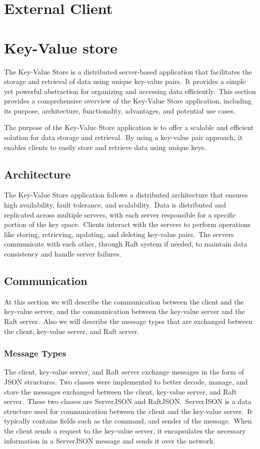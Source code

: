 \documentclass{article}
\begin{document}
\section{External Client}


\section{Key-Value store}
The Key-Value Store is a distributed server-based application that facilitates the storage
and retrieval of data using unique key-value pairs.\ It provides a simple yet powerful
abstraction for organizing and accessing data efficiently.\ This section provides a comprehensive
overview of the Key-Value Store application, including its purpose, architecture, functionality,
advantages, and potential use cases.

The purpose of the Key-Value Store application is to offer a scalable and efficient solution
for data storage and retrieval.\ By using a key-value pair approach, it enables clients to
easily store and retrieve data using unique keys.


\subsection{Architecture}
The Key-Value Store application follows a distributed architecture that ensures high availability,
fault tolerance, and scalability.\ Data is distributed and replicated across multiple servers,
with each server responsible for a specific portion of the key space.\ Clients interact with the
servers to perform operations like storing, retrieving, updating, and deleting key-value
pairs.\ The servers communicate with each other, through Raft system if needed, to maintain
data consistency and handle server failures.

\subsection{Communication}
At this section we will describe the communication between the client and the key-value server,
and the communication between the key-value server and the Raft server.\ Also we will describe
the message types that are exchanged between the client, key-value server, and Raft server.

\subsubsection{Message Types}
The client, key-value server, and Raft server exchange messages in the form of JSON structures.
Two classes were implemented to better decode, manage, and store the messages exchanged between
the client, key-value server, and Raft server.\ These two classes are ServerJSON and RaftJSON.\
ServerJSON is a data structure used for communication between the client and the key-value
server.\ It typically contains fields such as the command, and sender of the message.\ When
the client sends a request to the key-value server, it encapsulates the necessary information
in a ServerJSON message and sends it over the network.
\end{document}
